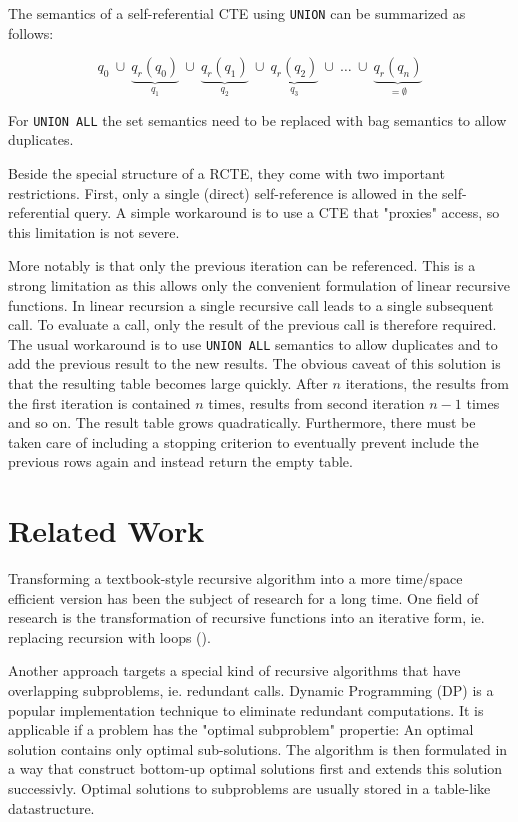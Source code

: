 The semantics of a self-referential CTE using \texttt{UNION} can be summarized as follows:

$$
q_0 ~\cup ~\underbrace{q_r(q_0)}_{q_1} ~\cup~ \underbrace{q_r(q_1)}_{q_2}~ \cup~\underbrace{q_r(q_2)}_{q_3}~ \cup ~\hdots ~ \cup ~ \underbrace{q_r(q_n)}_{= \emptyset}
$$

For \texttt{UNION ALL} the set semantics need to be replaced with bag semantics to allow duplicates.

Beside the special structure of a RCTE, they come with two important restrictions. First, only a single (direct) self-reference is allowed in the self-referential query. A simple workaround is to use a CTE that "proxies" access, so this limitation is not severe.

More notably is that only the previous iteration can be referenced. This is a strong limitation as this allows only the convenient formulation of linear recursive functions. In linear recursion a single recursive call leads to a single subsequent call. To evaluate a call, only the result of the previous call is therefore required. The usual workaround is to use \texttt{UNION ALL} semantics to allow duplicates and to add the previous result to the new results. The obvious caveat of this solution is that the resulting table becomes large quickly. After $n$ iterations, the results from the first iteration is contained $n$ times, results from second iteration $n-1$ times and so on. The result table grows quadratically. Furthermore, there must be taken care of including a stopping criterion to eventually prevent include the previous rows again and instead return the empty table.


\section{Related Work}

Transforming a textbook-style recursive algorithm into a more time/space efficient version has been the subject of research for a long time. One field of research is the transformation of recursive functions into an iterative form, ie. replacing recursion with loops (\cite{}).

Another approach targets a special kind of recursive algorithms that have overlapping subproblems, ie. redundant calls. Dynamic Programming (DP) is a popular implementation technique to eliminate redundant computations. It is applicable if a problem has the "optimal subproblem" propertie: An optimal solution contains only optimal sub-solutions. The algorithm is then formulated in a way that construct bottom-up optimal solutions first and extends this solution successivly. Optimal solutions to subproblems are usually stored in a table-like datastructure. \cite{}

